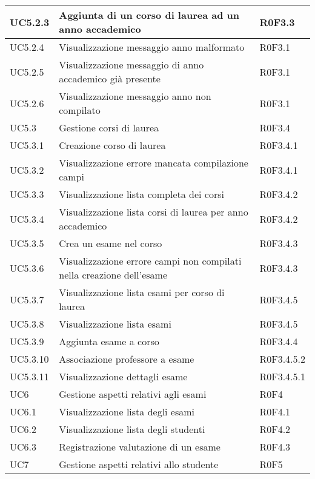 \documentclass[AnalisiDeiRequisiti.tex]{subfiles}
\begin{document}
\begin{longtable}[H]{|p{2cm}|p{5cm}|p{5cm}|}
	UC5.2.3 & Aggiunta di un corso di laurea ad un anno accademico & R0F3.3 \\ \hline
	UC5.2.4 & Visualizzazione messaggio anno malformato & R0F3.1 \\ \hline
	UC5.2.5 & Visualizzazione messaggio di anno accademico già presente & R0F3.1 \\ \hline
	UC5.2.6 & Visualizzazione messaggio anno non compilato &  R0F3.1 \\ \hline
	UC5.3 & Gestione corsi di laurea &  R0F3.4 \\  \hline
	UC5.3.1 & Creazione corso di laurea &  R0F3.4.1 \\ \hline
	UC5.3.2 & Visualizzazione errore mancata compilazione campi & R0F3.4.1 \\ \hline
	UC5.3.3 & Visualizzazione lista completa dei corsi &  R0F3.4.2 \\ \hline
	UC5.3.4 & Visualizzazione lista corsi di laurea per anno accademico & R0F3.4.2  \\ \hline
	UC5.3.5 & Crea un esame nel corso &  R0F3.4.3\\ \hline
	UC5.3.6 & Visualizzazione errore campi non compilati nella creazione dell'esame & R0F3.4.3  \\ \hline
	UC5.3.7 & Visualizzazione lista esami per corso di laurea & R0F3.4.5 \\ \hline
	UC5.3.8 & Visualizzazione lista esami &  R0F3.4.5 \\ \hline
	UC5.3.9 & Aggiunta esame a corso &  R0F3.4.4 \\ \hline
	UC5.3.10 & Associazione professore a esame & R0F3.4.5.2 \\ \hline
	UC5.3.11 & Visualizzazione dettagli esame & R0F3.4.5.1 \\ \hline
	UC6 & Gestione aspetti relativi agli esami & R0F4 \\ \hline
	UC6.1 & Visualizzazione lista degli esami & R0F4.1 \\ \hline
	UC6.2 & Visualizzazione lista degli studenti & R0F4.2  \\ \hline
	UC6.3 & Registrazione valutazione di un esame & R0F4.3 \\ \hline
	UC7 & Gestione aspetti relativi allo studente & R0F5 \\ \hline

\end{longtable}
\end{document}
